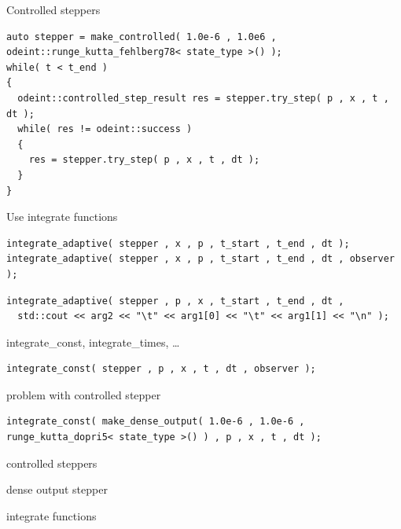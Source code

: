 \begin{frame}[fragile]

Controlled steppers

\begin{lstlisting}
auto stepper = make_controlled( 1.0e-6 , 1.0e6 ,  odeint::runge_kutta_fehlberg78< state_type >() );
while( t < t_end )
{
  odeint::controlled_step_result res = stepper.try_step( p , x , t , dt );
  while( res != odeint::success )
  {
    res = stepper.try_step( p , x , t , dt );
  }
}
\end{lstlisting}

Use integrate functions

\begin{lstlisting}
integrate_adaptive( stepper , x , p , t_start , t_end , dt ); 
integrate_adaptive( stepper , x , p , t_start , t_end , dt , observer );
\end{lstlisting}

\begin{lstlisting}
integrate_adaptive( stepper , p , x , t_start , t_end , dt ,
  std::cout << arg2 << "\t" << arg1[0] << "\t" << arg1[1] << "\n" );
\end{lstlisting}

integrate\_const, integrate\_times, \dots

\end{frame}



\begin{frame}[fragile]

\begin{lstlisting}
integrate_const( stepper , p , x , t , dt , observer );
\end{lstlisting}

problem with controlled stepper

\begin{lstlisting}
integrate_const( make_dense_output( 1.0e-6 , 1.0e-6 , runge_kutta_dopri5< state_type >() ) , p , x , t , dt );
\end{lstlisting}


\end{frame}




\begin{frame}[fragile]
 controlled steppers
\end{frame}

\begin{frame}[fragile]
 dense output stepper
\end{frame}

\begin{frame}[fragile]
 integrate functions
\end{frame}



